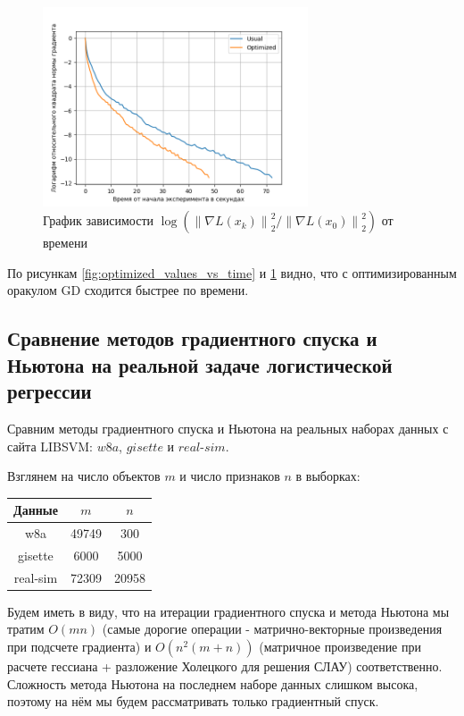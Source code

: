 \documentclass[11pt]{article}
\begin{document}
\begin{figure}[h!p]
	\centering
    \includegraphics[width=0.7\textwidth]{pics/logreg_grad_norm_vs_time.png}
\captionsetup{justification=centering}
\caption{График зависимости $
\log\left(\left\|\nabla L\left(x_{k}\right)\right\|_{2}^{2} /\left\|\nabla L\left(x_{0}\right)\right\|_{2}^{2}\right)
$ от времени}
\label{fig:optimized_grad_vs_time}
\end{figure}

По рисункам \ref{fig:optimized_values_vs_time} и \ref{fig:optimized_grad_vs_time}  видно, что с оптимизированным оракулом GD сходится быстрее по времени.

\newpage
\subsection{Сравнение методов градиентного спуска и Ньютона на
реальной задаче логистической регрессии}

Сравним методы градиентного спуска и Ньютона на реальных наборах данных с сайта LIBSVM: $w8a$, $gisette$ и
$real$-$sim$.

Взглянем на число объектов $m$ и число признаков $n$ в выборках:
\begin{center}
\begin{tabular}{|c|c|c|} 
 \hline
 Данные & $m$ & $n$ \\ [0.5ex] 
 \hline\hline
 w8a & 49749 & 300 \\ 
 \hline
 gisette & 6000 & 5000 \\ 
 \hline
 real-sim & 72309 & 20958 \\ 
 \hline
\end{tabular}
\end{center}

Будем иметь в виду, что на итерации градиентного спуска и метода Ньютона мы тратим $O(mn)$ (самые дорогие операции - матрично-векторные произведения при подсчете градиента) и $O(n^2(m + n))$ (матричное произведение при расчете гессиана + разложение Холецкого для решения СЛАУ)
соответственно. Сложность метода Ньютона на последнем наборе данных слишком высока, поэтому на нём мы будем рассматривать только градиентный спуск.
\end{document}
